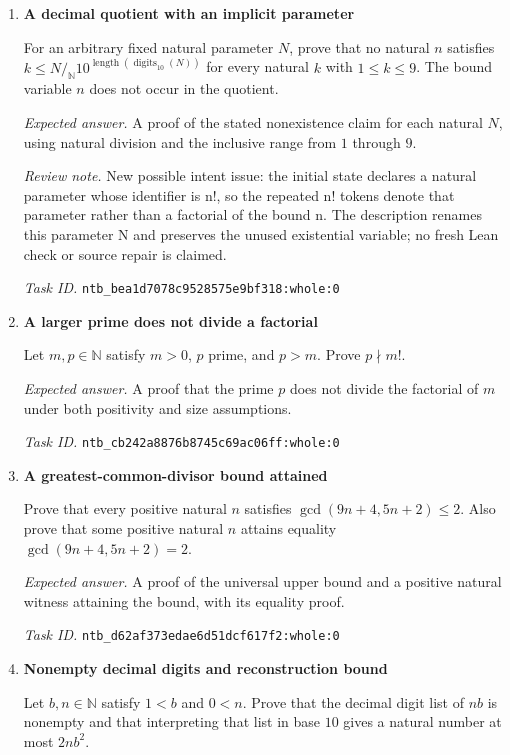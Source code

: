 \documentclass[11pt]{article}
\newcommand{\pth}[1]{\nolinkurl{#1}}
\begin{document}
\begin{enumerate}[label={DEV \arabic*.},leftmargin=4.5em,itemsep=1em]
\item \textbf{A decimal quotient with an implicit parameter}\label{qn:dev:27}

For an arbitrary fixed natural parameter $N$, prove that no natural $n$ satisfies $k\le N\mathbin{/_{\mathbb N}}10^{\operatorname{length}(\operatorname{digits}_{10}(N))}$ for every natural $k$ with $1\le k\le9$. The bound variable $n$ does not occur in the quotient.

\emph{Expected answer.} A proof of the stated nonexistence claim for each natural $N$, using natural division and the inclusive range from $1$ through $9$.

\emph{Review note.} New possible intent issue: the initial state declares a natural parameter whose identifier is n!, so the repeated n! tokens denote that parameter rather than a factorial of the bound n. The description renames this parameter N and preserves the unused existential variable; no fresh Lean check or source repair is claimed.

\emph{Task ID.} \pth{ntb_bea1d7078c9528575e9bf318:whole:0}

\item \textbf{A larger prime does not divide a factorial}\label{qn:dev:28}

Let $m,p\in\mathbb N$ satisfy $m>0$, $p$ prime, and $p>m$. Prove $p\nmid m!$.

\emph{Expected answer.} A proof that the prime $p$ does not divide the factorial of $m$ under both positivity and size assumptions.

\emph{Task ID.} \pth{ntb_cb242a8876b8745c69ac06ff:whole:0}

\item \textbf{A greatest-common-divisor bound attained}\label{qn:dev:29}

Prove that every positive natural $n$ satisfies $\gcd(9n+4,5n+2)\le2$. Also prove that some positive natural $n$ attains equality $\gcd(9n+4,5n+2)=2$.

\emph{Expected answer.} A proof of the universal upper bound and a positive natural witness attaining the bound, with its equality proof.

\emph{Task ID.} \pth{ntb_d62af373edae6d51dcf617f2:whole:0}

\item \textbf{Nonempty decimal digits and reconstruction bound}\label{qn:dev:30}

Let $b,n\in\mathbb N$ satisfy $1<b$ and $0<n$. Prove that the decimal digit list of $nb$ is nonempty and that interpreting that list in base $10$ gives a natural number at most $2nb^2$.


\end{enumerate}
\end{document}
